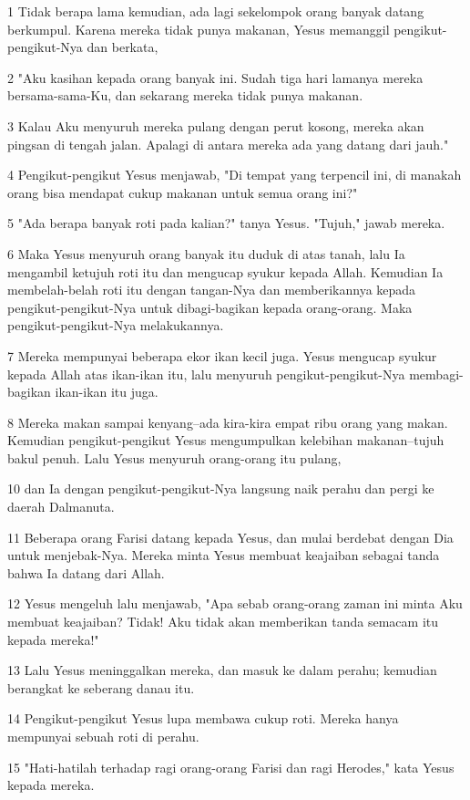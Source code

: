 \par 1 Tidak berapa lama kemudian, ada lagi sekelompok orang banyak datang berkumpul. Karena mereka tidak punya makanan, Yesus memanggil pengikut-pengikut-Nya dan berkata,
\par 2 "Aku kasihan kepada orang banyak ini. Sudah tiga hari lamanya mereka bersama-sama-Ku, dan sekarang mereka tidak punya makanan.
\par 3 Kalau Aku menyuruh mereka pulang dengan perut kosong, mereka akan pingsan di tengah jalan. Apalagi di antara mereka ada yang datang dari jauh."
\par 4 Pengikut-pengikut Yesus menjawab, "Di tempat yang terpencil ini, di manakah orang bisa mendapat cukup makanan untuk semua orang ini?"
\par 5 "Ada berapa banyak roti pada kalian?" tanya Yesus. "Tujuh," jawab mereka.
\par 6 Maka Yesus menyuruh orang banyak itu duduk di atas tanah, lalu Ia mengambil ketujuh roti itu dan mengucap syukur kepada Allah. Kemudian Ia membelah-belah roti itu dengan tangan-Nya dan memberikannya kepada pengikut-pengikut-Nya untuk dibagi-bagikan kepada orang-orang. Maka pengikut-pengikut-Nya melakukannya.
\par 7 Mereka mempunyai beberapa ekor ikan kecil juga. Yesus mengucap syukur kepada Allah atas ikan-ikan itu, lalu menyuruh pengikut-pengikut-Nya membagi-bagikan ikan-ikan itu juga.
\par 8 Mereka makan sampai kenyang--ada kira-kira empat ribu orang yang makan. Kemudian pengikut-pengikut Yesus mengumpulkan kelebihan makanan--tujuh bakul penuh. Lalu Yesus menyuruh orang-orang itu pulang,
\par 10 dan Ia dengan pengikut-pengikut-Nya langsung naik perahu dan pergi ke daerah Dalmanuta.
\par 11 Beberapa orang Farisi datang kepada Yesus, dan mulai berdebat dengan Dia untuk menjebak-Nya. Mereka minta Yesus membuat keajaiban sebagai tanda bahwa Ia datang dari Allah.
\par 12 Yesus mengeluh lalu menjawab, "Apa sebab orang-orang zaman ini minta Aku membuat keajaiban? Tidak! Aku tidak akan memberikan tanda semacam itu kepada mereka!"
\par 13 Lalu Yesus meninggalkan mereka, dan masuk ke dalam perahu; kemudian berangkat ke seberang danau itu.
\par 14 Pengikut-pengikut Yesus lupa membawa cukup roti. Mereka hanya mempunyai sebuah roti di perahu.
\par 15 "Hati-hatilah terhadap ragi orang-orang Farisi dan ragi Herodes," kata Yesus kepada mereka.

